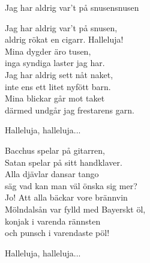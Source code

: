 \begin{song}{Jag har aldrig var't på snusen}{snusen}
\begin{vers}
Jag har aldrig var't på snusen,\\
aldrig rökat en cigarr. Halleluja!\\
Mina dygder äro tusen,\\
inga syndiga laster jag har.\\
Jag har aldrig sett nåt naket,\\
inte ens ett litet nyfött barn.\\
Mina blickar går mot taket\\
därmed undgår jag frestarens garn.\\
\end{vers}
\begin{vers}
Halleluja, halleluja...\\
\end{vers}
\begin{vers}
Bacchus spelar på gitarren,\\
Satan spelar på sitt handklaver.\\
Alla djävlar dansar tango\\
säg vad kan man väl önska sig mer?\\
Jo! Att alla bäckar vore brännvin\\
Mölndalsån var fylld med Bayerskt öl,\\
konjak i varenda rännsten\\
och punsch i varendaste pöl!\\
\end{vers}
\begin{vers}
Halleluja, halleluja...\\
\end{vers}
\end{song}

